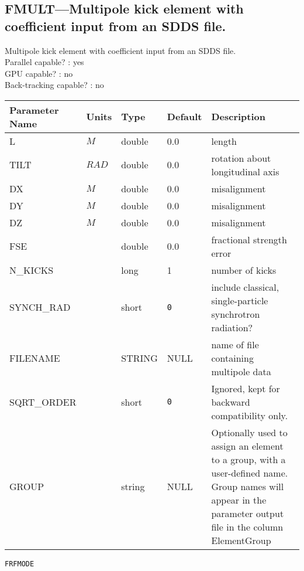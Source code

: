 \subsection{FMULT---Multipole kick element with coefficient input from an SDDS file.}
Multipole kick element with coefficient input from an SDDS file.
\\
Parallel capable? : yes\\
GPU capable? : no\\
Back-tracking capable? : no\\
\begin{tabular}{|l|l|l|l|p{\descwidth}|} \hline
Parameter Name & Units & Type & Default & Description \\ \hline 
L & $M$ & double &  0.0 & length  \\ \hline 
TILT & $RAD$ & double &  0.0 & rotation about longitudinal axis  \\ \hline 
DX & $M$ & double &  0.0 & misalignment  \\ \hline 
DY & $M$ & double &  0.0 & misalignment  \\ \hline 
DZ & $M$ & double &  0.0 & misalignment  \\ \hline 
FSE &  & double &  0.0 & fractional strength error  \\ \hline 
N\_KICKS &  & long &   1               & number of kicks  \\ \hline 
SYNCH\_RAD &  & short &  \verb|0| & include classical, single-particle synchrotron radiation?  \\ \hline 
FILENAME &  & STRING &   NULL            & name of file containing multipole data  \\ \hline 
SQRT\_ORDER &  & short &  \verb|0| & Ignored, kept for backward compatibility only.  \\ \hline 
GROUP &  & string & NULL & Optionally used to assign an element to a group, with a user-defined name.  Group names will appear in the parameter output file in the column ElementGroup  \\ \hline 
\end{tabular}

\vspace*{0.5in}

\newpage
\begin{center}{\Large\verb|FRFMODE|}\end{center}
